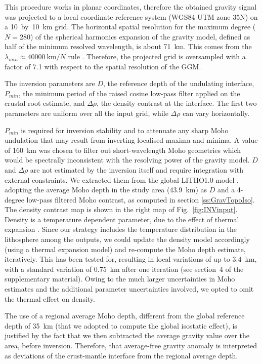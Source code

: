 This procedure works in planar coordinates, therefore the obtained gravity signal was projected to a local coordinate reference system (WGS84 UTM zone 35N) on a 10~by~10~{km} grid.
The horizontal spatial resolution for the maximum degree ($N=280$) of the spherical harmonics expansion of the gravity model, defined as half of the minimum resolved wavelength, is about 71~km. This comes from the $\lambda_{min} \approx 40000~\textrm{km} / N $ rule \parencite{HofmannWellenhof2006}.
Therefore, the projected grid is oversampled with a factor of 7.1 with respect to the spatial resolution of the GGM.

The inversion parameters are $D$, the reference depth of the undulating interface, $P_{min}$, the minimum period of the raised cosine low-pass filter applied on the crustal root estimate, and $\Delta \rho$, the density contrast at the interface.
The first two parameters are uniform over all the input grid, while $\Delta \rho$ can vary horizontally.

$P_{min}$ is required for inversion stability and to attenuate any sharp Moho undulation that may result from inverting localised maxima and minima.
A value of 160~{km} was chosen to filter out short-wavelength Moho geometries which would be spectrally inconsistent with the resolving power of the gravity model.
$D$ and $\Delta \rho$ are not estimated by the inversion itself and require integration with external constraints.
We extracted them from the global {LITHO1.0} model \parencite{Pasyanos2014}, adopting the average Moho depth in the study area (43.9~km) as $D$ and a 4-degree low-pass filtered Moho contrast, as computed in section \ref{ss:GravTopoIso}.
The density contrast map is shown in the right map of Fig.~\ref{fig:INVinput}.
Density is a temperature dependent parameter, due to the effect of thermal expansion \parencite{allen2013basin}.
Since our strategy includes the temperature distribution in the lithosphere among the outputs, we could update the density model accordingly (using a thermal expansion model) and re-compute the Moho depth estimate, iteratively.
This has been tested for, resulting in local variations of up to $3.4$~km, with a standard variation of $0.75$~km after one iteration (see section~4 of the supplementary material).
Owing to the much larger uncertainties in Moho estimates \parencite[\textpm~5 to \textpm~15 percent, see ][]{Grad2009} and the additional parameter uncertainties involved, we opted to omit the thermal effect on density.

The use of a regional average Moho depth, different from the global reference depth of 35~km (that we adopted to compute the global isostatic effect), is justified by the fact that we then subtracted the average gravity value over the area, before inversion.
Therefore, that average-free gravity anomaly is interpreted as deviations of the crust-mantle interface from the regional average depth.

